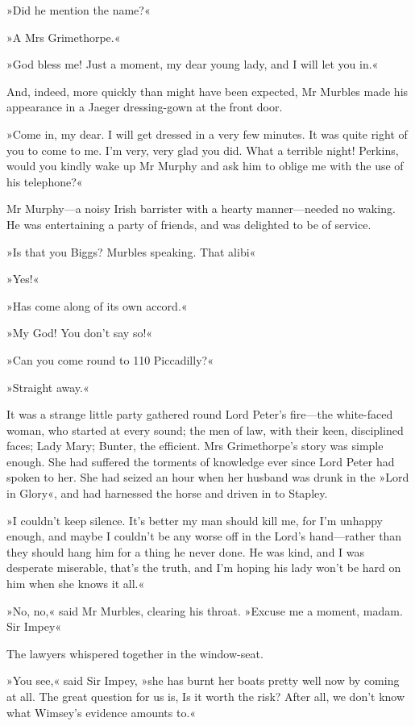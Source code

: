 »Did he mention the name?«

»A Mrs Grimethorpe.«

»God bless me! Just a moment, my dear young lady, and I will let you in.«

And, indeed, more quickly than might have been expected, Mr Murbles made his appearance in a Jaeger dressing-gown at the front door.

»Come in, my dear. I will get dressed in a very few minutes. It was quite right of you to come to me. I'm very, very glad you did. What a terrible night! Perkins, would you kindly wake up Mr Murphy and ask him to oblige me with the use of his telephone?«

Mr Murphy\allowbreak---\allowbreak a noisy Irish barrister with a hearty manner\allowbreak---\allowbreak needed no waking. He was entertaining a party of friends, and was delighted to be of service.

»Is that you Biggs? Murbles speaking. That alibi\longdash«

»Yes!«

»Has come along of its own accord.«

»My God! You don't say so!«

»Can you come round to 110 Piccadilly?«

»Straight away.«

It was a strange little party gathered round Lord Peter's fire\allowbreak---\allowbreak the white-faced woman, who started at every sound; the men of law, with their keen, disciplined faces; Lady Mary; Bunter, the efficient. Mrs Grimethorpe's story was simple enough. She had suffered the torments of knowledge ever since Lord Peter had spoken to her. She had seized an hour when her husband was drunk in the »Lord in Glory«, and had harnessed the horse and driven in to Stapley.

»I couldn't keep silence. It's better my man should kill me, for I'm unhappy enough, and maybe I couldn't be any worse off in the Lord's hand\allowbreak---\allowbreak rather than they should hang him for a thing he never done. He was kind, and I was desperate miserable, that's the truth, and I'm hoping his lady won't be hard on him when she knows it all.«

»No, no,« said Mr Murbles, clearing his throat. »Excuse me a moment, madam. Sir Impey\longdash«

The lawyers whispered together in the window-seat.

»You see,« said Sir Impey, »she has burnt her boats pretty well now by coming at all. The great question for us is, Is it worth the risk? After all, we don't know what Wimsey's evidence amounts to.«

